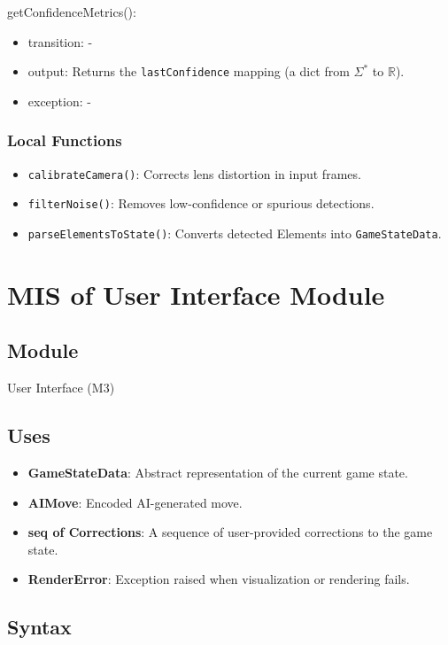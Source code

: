 \documentclass[12pt, titlepage]{article}
\begin{document}
\noindent getConfidenceMetrics():
\begin{itemize}
\item transition: -
\item output: Returns the \texttt{lastConfidence} mapping (a dict from $\Sigma^{*}$ to $\mathbb{R}$).
\item exception: -
\end{itemize}

\subsubsection{Local Functions}
\begin{itemize}
\item \texttt{calibrateCamera()}: Corrects lens distortion in input frames.
\item \texttt{filterNoise()}: Removes low-confidence or spurious detections.
\item \texttt{parseElementsToState()}: Converts detected Elements into \texttt{GameStateData}.
\end{itemize}



\section{MIS of User Interface Module} \label{M3}

\subsection{Module}
User Interface (M3)

\subsection{Uses}

\begin{itemize}
    \item \textbf{GameStateData}: Abstract representation of the current game state.
    \item \textbf{AIMove}: Encoded AI-generated move.
    \item \textbf{seq of Corrections}: A sequence of user-provided corrections to the game state.
    \item \textbf{RenderError}: Exception raised when visualization or rendering fails.
\end{itemize}

\subsection{Syntax}
\end{document}
